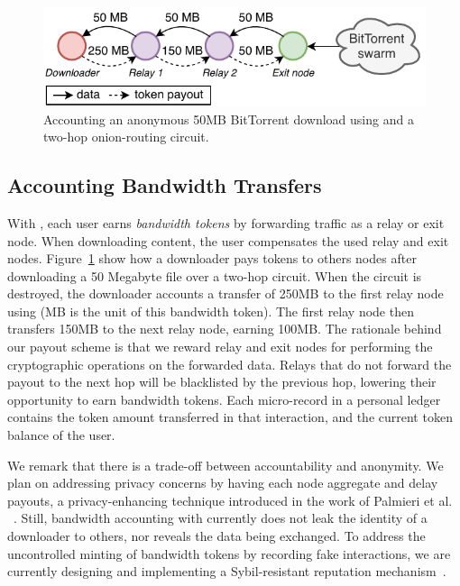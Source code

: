 \begin{figure}[t]
	\centering
	\includegraphics[width=\linewidth]{trustchain/assets/payouts}
	\caption{Accounting an anonymous 50MB BitTorrent download using \ModelName{} and a two-hop onion-routing circuit.}
	\label{fig:payouts}
\end{figure}

\subsection{Accounting Bandwidth Transfers}
With \ModelName{}, each user earns \emph{bandwidth tokens} by forwarding traffic as a relay or exit node.
When downloading content, the user compensates the used relay and exit nodes.
Figure~\ref{fig:payouts} show how a downloader pays tokens to others nodes after downloading a 50 Megabyte file over a two-hop circuit.
When the circuit is destroyed, the downloader accounts a transfer of 250MB to the first relay node using \ModelName{} (MB is the unit of this bandwidth token).
The first relay node then transfers 150MB to the next relay node, earning 100MB.
The rationale behind our payout scheme is that we reward relay and exit nodes for performing the cryptographic operations on the forwarded data.
Relays that do not forward the payout to the next hop will be blacklisted by the previous hop, lowering their opportunity to earn bandwidth tokens.
Each micro-record in a personal ledger contains the token amount transferred in that interaction, and the current token balance of the user.

We remark that there is a trade-off between accountability and anonymity.
We plan on addressing privacy concerns by having each node aggregate and delay payouts, a privacy-enhancing technique introduced in the work of Palmieri et al. ~\cite{palmieri2015paying}.
Still, bandwidth accounting with \ModelName{} currently does not leak the identity of a downloader to others, nor reveals the data being exchanged.
To address the uncontrolled minting of bandwidth tokens by recording fake interactions, we are currently designing and implementing a Sybil-resistant reputation mechanism~\cite{otte2017trustchain}.

